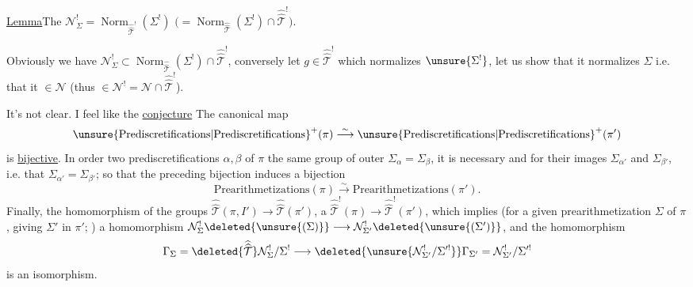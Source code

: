 \uline{Lemma}\quad The
$\mathcal N^{!}_{\Sigma}=\operatorname{Norm}_{\widehat{\widehat{\mathcal T}}^{!}}(\Sigma^{!})$
$\bigl(=\operatorname{Norm}_{\widehat{\widehat{\mathcal T}}}(\Sigma^{!})\cap
\widehat{\widehat{\mathcal T}}^{!}\bigr)$.


Obviously we have
$\mathcal N^{!}_{\Sigma}\subset
\operatorname{Norm}_{\widehat{\widehat{\mathcal T}}}(\Sigma^{!})\cap
\widehat{\widehat{\mathcal T}}^{!}$,
conversely let $g\in\widehat{\widehat{\mathcal T}}^{!}$ which normalizes
$\unsure{\Sigma^{!}}$, let us show that it normalizes $\Sigma$ i.e.
that it  $\in\mathcal N$
(thus $\in\mathcal N^{!}=\mathcal N\cap\widehat{\widehat{\mathcal T}}^{!}$).


It's not clear. I  feel like   the
\uline{conjecture} The canonical map
\[
\unsure{\text{Prediscretifications}|\text{Prediscretifications}}^{+}(\pi)
 \overset{\sim}{\longrightarrow}
\unsure{\text{Prediscretifications}|\text{Prediscretifications}}^{+}(\pi')
\]
is \uline{bijective}. In order  two  prediscretifications
$\alpha,\beta$ of $\pi$   the same group of outer 
$\Sigma_\alpha=\Sigma_\beta$,  it is necessary and 
 
for their images $\Sigma_{\alpha'}$ and $\Sigma_{\beta'}$, i.e. that
$\Sigma_{\alpha'}=\Sigma_{\beta'}$; so that the preceding bijection induces a bijection
\[
\text{Prearithmetizations}(\pi)\overset{\sim}{\longrightarrow}\text{Prearithmetizations}(\pi').
\]
Finally, 
the homomorphism of the groups 
$\widehat{\widehat{\mathcal T}}(\pi,I')\longrightarrow\widehat{\widehat{\mathcal T}}(\pi')$,
 
a $\widehat{\widehat{\mathcal T}}^{!}(\pi)\longrightarrow\widehat{\widehat{\mathcal T}}^{!}(\pi')$,
 which implies 
(for a given prearithmetization $\Sigma$ 
of $\pi$, giving $\Sigma'$ 
in $\pi'$; ) a
homomorphism
$\mathcal N_\Sigma^{!}\deleted{\unsure{(\Sigma)}}\longrightarrow
\mathcal N_{\Sigma'}^{!}\deleted{\unsure{(\Sigma')}}$,
 and the  homomorphism
\[
\Gamma_\Sigma=\deleted{\widehat{\widehat{\mathcal T}}}\mathcal N_\Sigma^{!}/\Sigma^{!}
 \longrightarrow
\deleted{\unsure{\mathcal N_{\Sigma'}^{!}/\Sigma'^{!}}}\Gamma_{\Sigma'}=\mathcal N_{\Sigma'}^{!}/\Sigma'^{!}
\]
is an isomorphism.

